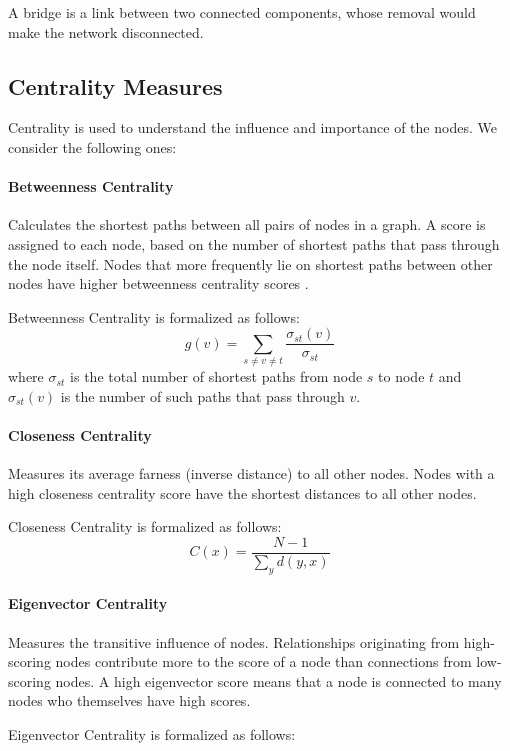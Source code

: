 \documentclass[10pt,twocolumn,letterpaper]{article}
\begin{document}
A bridge is a link between two connected components, whose removal would make the network disconnected.

\subsection{Centrality Measures}

Centrality is used to understand the influence and importance of the nodes. We consider the following ones:

\paragraph{Betweenness Centrality}

Calculates the shortest paths between all pairs of nodes in a graph. A score is assigned to each node, based on the number of shortest paths that pass through the node itself. Nodes that more frequently lie on shortest paths between other nodes have higher betweenness centrality scores \cite{centrality}.

Betweenness Centrality is formalized as follows:
$$
g(v)=\sum_{s \neq v \neq t} \frac{\sigma_{s t}(v)}{\sigma_{s t}}
$$
where $\sigma_{s t}$ is the total number of shortest paths from node $s$ to node $t$ and $\sigma_{s t}(v)$ is the number of such paths that pass through $v$.

\paragraph{Closeness Centrality}

Measures its average farness (inverse distance) to all other nodes. Nodes with a high closeness centrality score have the shortest distances to all other nodes.

Closeness Centrality is formalized as follows:
$$
C(x)=\frac{N-1}{\sum_{y} d(y, x)}
$$

\paragraph{Eigenvector Centrality}

Measures the transitive influence of nodes. Relationships originating from high-scoring nodes contribute more to the score of a node than connections from low-scoring nodes. A high eigenvector score means that a node is connected to many nodes who themselves have high scores.

Eigenvector Centrality is formalized as follows: \\
\end{document}
